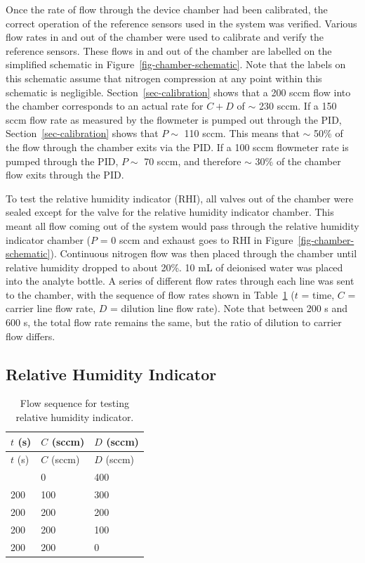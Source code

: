 \documentclass[
  a4paper,
]{scrbook}
\begin{document}
Once the rate of flow through the device chamber had been calibrated,
the correct operation of the reference sensors used in the system was
verified. Various flow rates in and out of the chamber were used to
calibrate and verify the reference sensors. These flows in and out of
the chamber are labelled on the simplified schematic in
Figure~\ref{fig-chamber-schematic}. Note that the labels on this
schematic assume that nitrogen compression at any point within this
schematic is negligible. Section~\ref{sec-calibration} shows that a 200
sccm flow into the chamber corresponds to an actual rate for \(C + D\)
of \(\sim\) 230 sccm. If a 150 sccm flow rate as measured by the
flowmeter is pumped out through the PID, Section~\ref{sec-calibration}
shows that \(P \sim\) 110 sccm. This means that \(\sim\) 50\% of the
flow through the chamber exits via the PID. If a 100 sccm flowmeter rate
is pumped through the PID, \(P \sim\) 70 sccm, and therefore \(\sim\)
30\% of the chamber flow exits through the PID.

To test the relative humidity indicator (RHI), all valves out of the
chamber were sealed except for the valve for the relative humidity
indicator chamber. This meant all flow coming out of the system would
pass through the relative humidity indicator chamber (\(P\) = 0 sccm and
exhaust goes to RHI in Figure~\ref{fig-chamber-schematic}). Continuous
nitrogen flow was then placed through the chamber until relative
humidity dropped to about 20\%. 10 mL of deionised water was placed into
the analyte bottle. A series of different flow rates through each line
was sent to the chamber, with the sequence of flow rates shown in
Table~\ref{tbl-RHI-flow-sequence} (\(t\) = time, \(C\) = carrier line
flow rate, \(D\) = dilution line flow rate). Note that between 200 s and
600 s, the total flow rate remains the same, but the ratio of dilution
to carrier flow differs.

\hypertarget{relative-humidity-indicator}{%
\subsection{Relative Humidity
Indicator}\label{relative-humidity-indicator}}

\hypertarget{tbl-RHI-flow-sequence}{}
\begin{longtable}[]{@{}lll@{}}
\caption{\label{tbl-RHI-flow-sequence}Flow sequence for testing relative
humidity indicator.}\tabularnewline
\toprule\noalign{}
\(t\) (s) & \(C\) (sccm) & \(D\) (sccm) \\
\midrule\noalign{}
\endfirsthead
\toprule\noalign{}
\(t\) (s) & \(C\) (sccm) & \(D\) (sccm) \\
\midrule\noalign{}
\endhead
\bottomrule\noalign{}
\endlastfoot
200 & 0 & 400 \\
200 & 100 & 300 \\
200 & 200 & 200 \\
200 & 200 & 100 \\
200 & 200 & 0 \\
\end{longtable}
\end{document}
